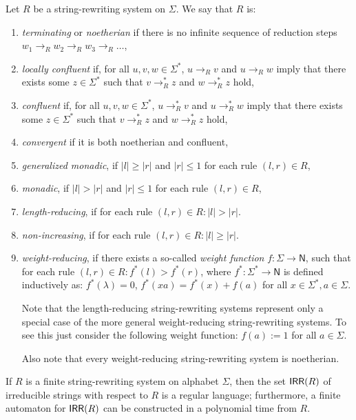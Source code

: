 \begin{definition}
Let $R$ be a string-rewriting system on $\Sigma$. We say that $R$ is:
\begin{enumerate}
\item \emph{terminating} or \emph{noetherian} if there is no infinite sequence of reduction steps $w_1 \to_R w_2 \to_R w_3 \to_R \ldots$,
\item \emph{locally confluent} if, for all $u, v, w \in \Sigma^*$, $u \to_R v$ and $u \to_R w$ imply that there exists some $z \in \Sigma^*$ such that $v \to_R^* z$ and $w \to_R^* z$ hold,
\item \emph{confluent} if, for all $u, v, w \in \Sigma^*$, $u \to_R^* v$ and $u \to_R^* w$ imply that there exists some $z \in \Sigma^*$ such that $v \to_R^* z$ and $w \to_R^* z$ hold,
\item \emph{convergent} if it is both noetherian and confluent,
\item \emph{generalized monadic}, if $|l| \ge |r|$ and $|r|\le 1$ for each rule $(l, r)\in R$,
\item \emph{monadic}, if $|l| > |r|$ and $|r|\le 1$ for each rule $(l, r)\in R$,
\item \emph{length-reducing}, if for each rule $(l, r) \in R: |l| > |r|$. 
\item \emph{non-increasing}, if for each rule $(l, r) \in R: |l| \ge |r|$. 
\item \emph{weight-reducing}, if there exists a so-called \emph{weight function} $f: \Sigma \to \mathsf{N}$, such that for each rule $(l, r) \in R: f^*(l) > f^*(r)$, where $f^*: \Sigma^* \to \mathsf{N}$ is defined inductively as: $f^*(\lambda) = 0$, $f^*(xa) = f^*(x) + f(a)$ for all $x \in \Sigma^*, a \in \Sigma$.

Note that the length-reducing string-rewriting systems represent only a special case of the more general weight-reducing string-rewriting systems. To see this just consider the following weight function: $f(a) := 1$ for all $a \in \Sigma$.

Also note that every weight-reducing string-rewriting system is noetherian.
\end{enumerate}
\end{definition}

\begin{lemma}
If $R$ is a finite string-rewriting system on alphabet $\Sigma$, then the set $\IRR(R)$ of irreducible strings with respect to $R$ is a regular language; furthermore, a finite automaton for $\IRR(R)$ can be constructed in a polynomial time from $R$.
\end{lemma}

